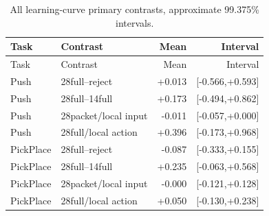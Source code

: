 \begin{longtable}{llrr}
\caption{All learning-curve primary contrasts, approximate 99.375\% intervals.}\label{tab:curveall}\\
\toprule Task & Contrast & Mean & Interval\\\midrule\endfirsthead
\toprule Task & Contrast & Mean & Interval\\\midrule\endhead
Push & 28full--reject & +0.013 & [-0.566,+0.593]\\
Push & 28full--14full & +0.173 & [-0.494,+0.862]\\
Push & 28packet/local input & -0.011 & [-0.057,+0.000]\\
Push & 28full/local action & +0.396 & [-0.173,+0.968]\\
PickPlace & 28full--reject & -0.087 & [-0.333,+0.155]\\
PickPlace & 28full--14full & +0.235 & [-0.063,+0.568]\\
PickPlace & 28packet/local input & -0.000 & [-0.121,+0.128]\\
PickPlace & 28full/local action & +0.050 & [-0.130,+0.238]\\
\bottomrule\end{longtable}
